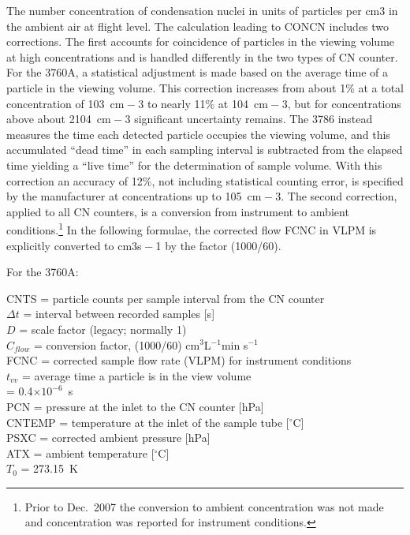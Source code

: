\documentclass[
  english,
]{book}
\begin{document}
The number concentration of condensation nuclei in units of particles per cm{3} in the ambient air at flight level. The calculation leading to CONCN includes two corrections. The first accounts for coincidence of particles in the viewing volume at high concentrations and is handled differently in the two types of CN counter. For the 3760A, a statistical adjustment is made based on the average time of a particle in the viewing volume. This correction increases from about 1\% at a total concentration of 10{3}~cm{ − 3} to nearly 11\% at 10{4}~cm{ − 3}, but for concentrations above about 210{4}~cm{ − 3} significant uncertainty remains. The 3786 instead measures the time each detected particle occupies the viewing volume, and this accumulated ``dead time'' in each sampling interval is subtracted from the elapsed time yielding a ``live time'' for the determination of sample volume. With this correction an accuracy of 12\%, not including statistical counting error, is specified by the manufacturer at concentrations up to 10{5}~cm{ − 3}. The second correction, applied to all CN counters, is a conversion from instrument to ambient conditions.\footnote{Prior to Dec.~2007 the conversion to ambient concentration was not made and concentration was reported for instrument conditions.}
In the following formulae, the corrected flow FCNC in VLPM is explicitly converted to cm{3}s{ − 1} by the factor (1000/60).

For the 3760A:

CNTS = particle counts per sample interval from the CN counter\\
\(\Delta t\) = interval
between recorded samples {[}s{]}\\
\(D\) = scale factor (legacy; normally 1)\\
\(C_{flow}\) = conversion
factor, (1000/60) cm\(^{3}\)L\(^{-1}\)min s\(^{-1}\)\\
FCNC = corrected sample flow rate (VLPM) for instrument conditions\\
\(t_{vv}\) = average time a particle is in the view volume\\
\hspace*{0.333em}\hspace*{0.333em}\hspace*{0.333em}\hspace*{0.333em}\hspace*{0.333em}\hspace*{0.333em}\hspace*{0.333em}= 0.4\(\times10^{-6}\)~s\\
PCN = pressure at the inlet to the CN counter {[}hPa{]}\\
CNTEMP = temperature at the inlet of the sample tube {[}\(^{\circ}\)C{]}\\
PSXC = corrected ambient pressure {[}hPa{]}\\
ATX = ambient temperature {[}\(^{\circ}\)C{]}\\
\(T_{0}\) = 273.15~K
\end{document}
